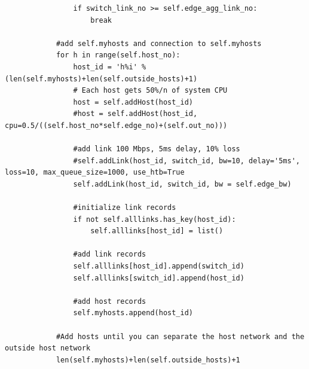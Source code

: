 \documentclass[12pt,english,oneside]{book}
\begin{document}
\begin{lstlisting}
                if switch_link_no >= self.edge_agg_link_no:
                    break
            
            #add self.myhosts and connection to self.myhosts
            for h in range(self.host_no):
                host_id = 'h%i' % (len(self.myhosts)+len(self.outside_hosts)+1)
                # Each host gets 50%/n of system CPU
                host = self.addHost(host_id)
                #host = self.addHost(host_id, cpu=0.5/((self.host_no*self.edge_no)+(self.out_no)))
                
                #add link 100 Mbps, 5ms delay, 10% loss
                #self.addLink(host_id, switch_id, bw=10, delay='5ms', loss=10, max_queue_size=1000, use_htb=True
                self.addLink(host_id, switch_id, bw = self.edge_bw)
                
                #initialize link records
                if not self.alllinks.has_key(host_id):
                    self.alllinks[host_id] = list()
                    
                #add link records
                self.alllinks[host_id].append(switch_id)
                self.alllinks[switch_id].append(host_id)
                
                #add host records
                self.myhosts.append(host_id)
            
            #Add hosts until you can separate the host network and the outside host network
            len(self.myhosts)+len(self.outside_hosts)+1
\end{lstlisting}
\end{document}
